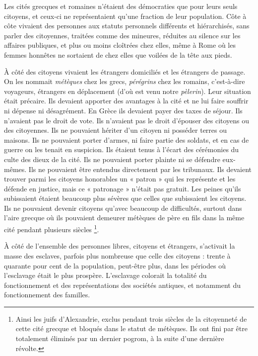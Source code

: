 Les cités grecques et romaines n'étaient des démocraties que pour
leurs seuls citoyens, et ceux-ci ne représentaient qu'une fraction de leur
population. Côte à côte vivaient des personnes aux statuts personnels
différents et hiérarchisés, sans parler des citoyennes, traitées comme des
mineures, réduites au silence sur les affaires publiques, et plus ou moins
cloîtrées chez elles, même à Rome où les femmes honnêtes ne sortaient
de chez elles que voilées de la tête aux pieds.

À côté des citoyens vivaient les étrangers domiciliés et les étrangers
de passage. On les nommait \emph{métèques} chez les grecs, \emph{pérégrins} chez les
romains, c'est-à-dire voyageurs, étrangers en déplacement (d'où est venu
notre \emph{pèlerin}). Leur situation était précaire. Ils devaient apporter des avantages
à la cité et ne lui faire souffrir ni dépense ni désagrément. En Grèce
ils devaient payer des taxes de séjour. Ils n'avaient pas le droit de vote. Ils
n'avaient pas le droit d'épouser des citoyens ou des citoyennes. Ils ne
pouvaient hériter d'un citoyen ni posséder terres ou maisons. Ils ne pouvaient
porter d'armes, ni faire partie des soldats, et en cas de guerre on
les tenait en suspicion. Ils étaient tenus à l'écart des cérémonies du culte
des dieux de la cité. Ils ne pouvaient porter plainte ni se défendre eux-mêmes.
Ils ne pouvaient être entendus directement par les tribunaux. Ils
devaient trouver parmi les citoyens honorables un « patron » qui les représente
et les défende en justice, mais ce « patronage » n'était pas gratuit.
Les peines qu'ils subissaient étaient beaucoup plus sévères que celles
que subissaient les citoyens. Ils ne pouvaient devenir citoyens qu'avec
beaucoup de difficultés, surtout dans l'aire grecque où ils pouvaient demeurer
métèques de père en fils dans la même cité pendant plusieurs siècles%
%
\footnote{Ainsi
les juifs d'Alexandrie, exclus pendant trois siècles de la citoyenneté de cette cité grecque et bloqués dans le statut de métèques. Ils ont fini par être totalement éliminés par un dernier pogrom, à la suite d'une dernière révolte.}.

À côté de l'ensemble des personnes libres, citoyens et étrangers,
s'activait la masse des esclaves, parfois plus nombreuse que celle des citoyens
: trente à quarante pour cent de la population, peut-être plus, dans
les périodes où l'esclavage était le plus prospère. L'esclavage colorait la
totalité du fonctionnement et des représentations des sociétés antiques,
et notamment du fonctionnement des familles.

